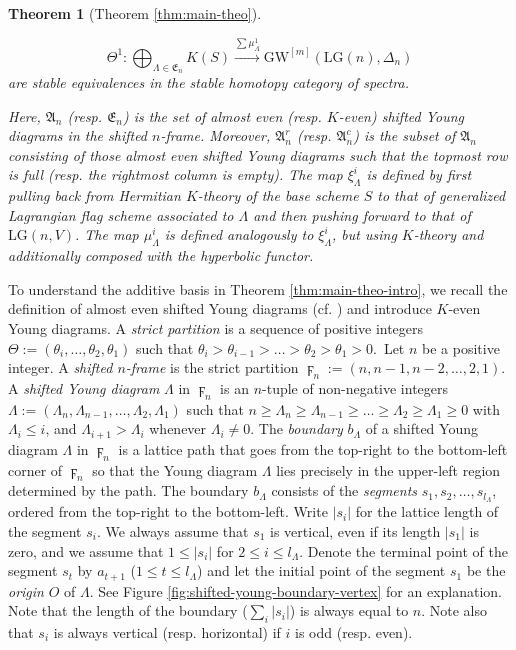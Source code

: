 \documentclass[a4paper]{amsart}
\theoremstyle{plain}
\newtheorem{theorem}{Theorem}[section]
\theoremstyle{definition}
\numberwithin{equation}{section}
\newcommand{\GW}{\mathrm{GW}}
\newcommand{\LG}{\mathrm{LG}}
\begin{document}
\begin{theorem}[Theorem \ref{thm:main-theo}]
\begin{enumerate}[leftmargin=20pt,label={\rm (\alph*)},ref=(\alph*)]
              \[
                  \Theta^1: \bigoplus_{\Lambda \in \mathfrak{E}_n } K(S) \xrightarrow{ \sum \mu_\Lambda^1} \GW^{[m]}(\LG(n), \Delta_n)
              \]
              are stable equivalences in the stable homotopy category of spectra.
    \end{enumerate}
    Here, $\mathfrak{A}_n$ (resp. $\mathfrak{E}_n$) is the set of almost even (resp. $K$-even) shifted Young diagrams in the shifted $n$-frame. Moreover, $\mathfrak{A}_n^r$ (resp.  $\mathfrak{A}_n^c$) is the subset of $\mathfrak{A}_n$ consisting of those almost even shifted Young diagrams such that the topmost row is full (resp. the rightmost column is empty). The map $\xi^i_\Lambda$ is defined by first pulling back from Hermitian $K$-theory of the base scheme $S$ to that of generalized Lagrangian flag scheme associated to $\Lambda$ and then pushing forward to that of $\LG(n,V)$. The map $\mu^i_\Lambda$ is defined analogously to $\xi^i_\Lambda$, but using $K$-theory and additionally composed with the hyperbolic functor.
\end{theorem}

To understand the additive basis in Theorem \ref{thm:main-theo-intro}, we recall the definition of almost even shifted Young diagrams (cf. \cite{martirosian2021witt}) and introduce $K$-even Young diagrams. A \textit{strict partition} is a sequence of positive integers $\Theta:=(\theta_i, \ldots ,\theta_2, \theta_1)$ such that $\theta_{i} > \theta_{i-1} > \ldots > \theta_2 > \theta_1 > 0$.\ Let $n$ be a positive integer. A \textit{shifted $n$-frame} is the strict partition
$ \digamma_n  :=  (n,n-1,n-2,\ldots,2,1).$
A \textit{shifted Young diagram} $\Lambda$ in $\digamma_{n}$ is an $n$-tuple of non-negative integers
$\Lambda:=(\Lambda_n, \Lambda_{n-1}, \ldots, \Lambda_2, \Lambda_1)$
such that
$n \geq \Lambda_{n} \geq \Lambda_{n-1} \geq \ldots \geq \Lambda_2 \geq \Lambda_1 \geq 0$
with $\Lambda_i \leq i$, and $\Lambda_{i+1} > \Lambda_{i}$ whenever $\Lambda_{i} \neq 0$.
The \textit{boundary} $b_{\Lambda}$ of a shifted Young diagram $\Lambda$ in $\digamma_n$ is a lattice path that goes from the top-right to the bottom-left corner of $\digamma_n$ so that the Young diagram $\Lambda$ lies precisely in the upper-left region determined by the path. The boundary $b_{\Lambda}$ consists of the \textit{segments} $s_1, s_2, \ldots, s_{l_\Lambda}$, ordered from the top-right to the bottom-left. Write $|s_i|$ for the lattice length of the segment $s_i$. We always assume that $s_1$ is vertical, even if its length $|s_1|$ is zero, and we assume that $1 \leq |s_i| $ for $ 2\leq i \leq l_\Lambda$. Denote the terminal point of the segment $s_{t}$ by $a_{t+1}$ ($1 \leq t \leq l_{\Lambda}$) and let the initial point of the segment $s_1$ be the \textit{origin} $O$ of $\Lambda$. 
See Figure \ref{fig:shifted-young-boundary-vertex} for an explanation. Note that the length of the boundary ($\sum_{i} |s_i|$) is always equal to $n$. Note also that $s_i$ is always vertical (resp. horizontal) if $i$ is odd (resp. even).
\end{document}
